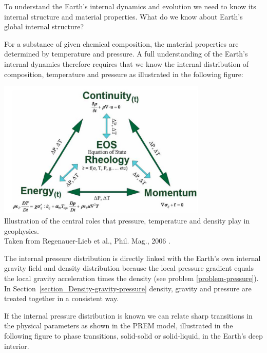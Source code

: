 To understand the Earth's internal dynamics and evolution we need
to know its internal structure and material properties.
What do we know about Earth's global internal structure?

For a substance of given chemical composition, the material properties
are determined by temperature and pressure.
A full understanding of the Earth's internal dynamics therefore
requires that we know the internal distribution of composition, 
temperature and pressure as illustrated in the following figure:

\begin{center}
\includegraphics[width=10cm]{images/gravity/reg}\\
{\captionfont
Illustration of the central roles that pressure, temperature and density play in geophysics.\\ 
Taken from Regenauer-Lieb et al., Phil. Mag., 2006 \cite{rehy06}.
}
\end{center}
 
The internal pressure distribution is directly linked with the Earth's 
own internal gravity field and density distribution because
the local pressure gradient equals the local gravity acceleration
times the density (see problem \ref{problem-pressure}).
In Section~\ref{section_Density-gravity-pressure} density, gravity
and pressure are treated together in a consistent way. 

If the internal pressure distribution is known we can relate sharp
transitions in the physical parameters as shown in the PREM model,
illustrated in the following figure 
to phase transitions, solid-solid or solid-liquid, 
in the Earth's deep interior.

